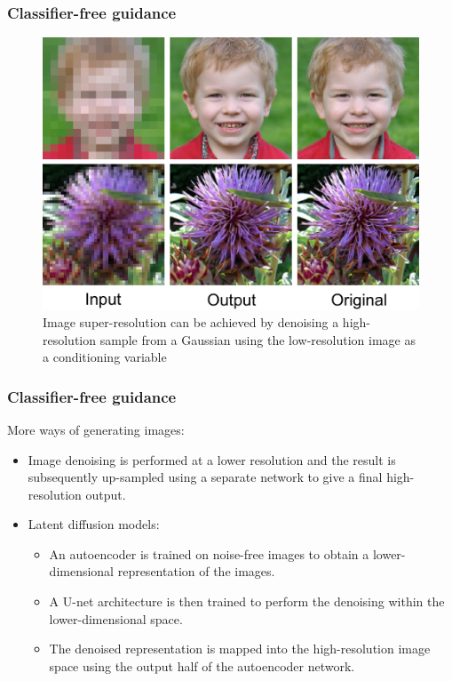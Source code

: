 \documentclass{beamer}
\begin{document}
\begin{frame}
    \frametitle{Classifier-free guidance}
    \begin{figure}
        \caption{Image super-resolution can be achieved by denoising a high-resolution sample from a Gaussian using the low-resolution image as a conditioning variable}
        \includegraphics[height=0.6\textheight]{Figure_8.pdf}
    \end{figure}
\end{frame}

\begin{frame}
    \frametitle{Classifier-free guidance}
    More ways of generating images:
    \begin{itemize}
        \item Image denoising is performed at a lower resolution and the result is subsequently up-sampled using a separate network to give a final high-resolution output.
        \item Latent diffusion models:
        \begin{itemize}
            \item An autoencoder is trained on noise-free images to obtain a lower-dimensional representation of the images.
            \item A U-net architecture is then trained to perform the denoising within the lower-dimensional space.
            \item The denoised representation is mapped into the high-resolution image space using the output half of the autoencoder network.
        \end{itemize}
    \end{itemize}
\end{frame}
\end{document}
